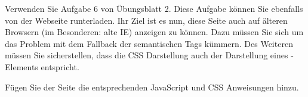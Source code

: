%
\par Verwenden Sie Aufgabe 6 von Übungsblatt 2. Diese Aufgabe können Sie ebenfalls von der Webseite runterladen. Ihr Ziel ist es nun, diese Seite auch auf älteren Browsern (im Besonderen: alte IE) anzeigen zu können. Dazu müssen Sie sich um das Problem mit dem Fallback der semantischen Tags kümmern. Des Weiteren müssen Sie sicherstellen, dass die CSS Darstellung auch der Darstellung eines -Elements entspricht.
%
\par Fügen Sie der Seite die entsprechenden JavaScript und CSS Anweisungen hinzu.